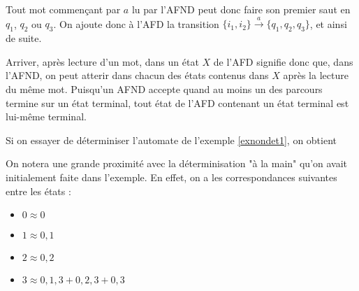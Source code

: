 Tout mot commençant par $a$ lu par l'AFND peut donc faire son premier saut en $q_1$, $q_2$ ou $q_3$. On ajoute donc à l'AFD la transition $\{i_1,i_2\} \xrightarrow{a} \{q_1, q_2, q_3\}$, et ainsi de suite.

Arriver, après lecture d'un mot, dans un état $X$ de l'AFD signifie donc que, dans l'AFND, on peut atterir dans chacun des états contenus dans $X$ après la lecture du même mot. Puisqu'un AFND accepte quand au moins un des parcours termine sur un état terminal, tout état de l'AFD contenant un état terminal est lui-même terminal. 

\begin{example}
\label{detex1}
Si on essayer de déterminiser l'automate de l'exemple \ref{exnondet1}, on obtient

\begin{figure}[!ht]
\centering
{}
\end{figure}

On notera une grande proximité avec la déterminisation "à la main" qu'on avait initialement faite dans l'exemple. En effet, on a les correspondances suivantes entre les états :

\begin{itemize}
\item $0 \approx 0$
\item $1 \approx 0,1$
\item $2 \approx 0,2$
\item $3 \approx 0,1,3 + 0,2,3 + 0,3$
\end{itemize}
\end{example}

